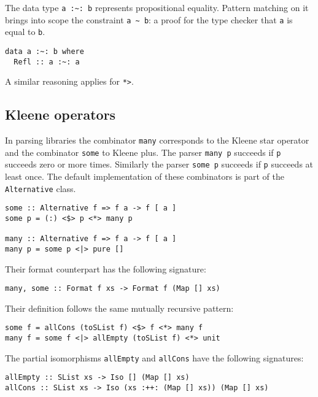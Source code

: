 \documentclass[../Thesis.tex]{subfiles}
\begin{document}
The data type \texttt{a :\textasciitilde: b} represents propositional equality. Pattern matching on it brings into scope the constraint \texttt{a \textasciitilde\ b}: a proof for the type checker that \texttt{a} is equal to \texttt{b}.

\begin{verbatim}
data a :~: b where
  Refl :: a :~: a
\end{verbatim}

A similar reasoning applies for \texttt{*>}.

\subsection{Kleene operators}
\label{subsec:Many}
In parsing libraries the combinator \texttt{many} corresponds to the Kleene star operator and the combinator \texttt{some} to Kleene plus. The parser \texttt{many p} succeeds if \texttt{p} succeeds zero or more times. Similarly the parser \texttt{some p} succeeds if \texttt{p} succeeds at least once.
The default implementation of these combinators is part of the \texttt{Alternative} class. 
\begin{verbatim}
some :: Alternative f => f a -> f [ a ]
some p = (:) <$> p <*> many p

many :: Alternative f => f a -> f [ a ]
many p = some p <|> pure []
\end{verbatim}

Their format counterpart has the following signature:
\begin{verbatim}
many, some :: Format f xs -> Format f (Map [] xs)
\end{verbatim}

Their definition follows the same mutually recursive pattern:
\begin{verbatim}
some f = allCons (toSList f) <$> f <*> many f
many f = some f <|> allEmpty (toSList f) <*> unit
\end{verbatim}

The partial isomorphisms \texttt{allEmpty} and \texttt{allCons} have the following signatures:

\begin{verbatim}
allEmpty :: SList xs -> Iso [] (Map [] xs)
allCons :: SList xs -> Iso (xs :++: (Map [] xs)) (Map [] xs)
\end{verbatim}

\end{document}
